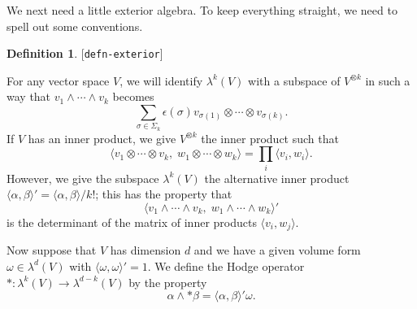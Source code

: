 \documentclass[reqno]{amsart}
\newcommand{\lbl}[1]{\label{#1}\textup{[\texttt{#1}]}\par}
\newcommand{\lbl}{\label}
\newcommand{\Sg}        {\Sigma}
\newcommand{\al}        {\alpha}
\newcommand{\bt}        {\beta}
\newcommand{\ep}        {\epsilon}
\newcommand{\lm}        {\lambda}
\newcommand{\om}        {\omega}
\newcommand{\sg}        {\sigma}
\newcommand{\ip}[1]     {\langle #1\rangle}
\newcommand{\ot}        {\otimes}
\renewcommand{\:}{\colon}
\theoremstyle{definition}
\newtheorem{definition}[theorem]{Definition}
\begin{document}
We next need a little exterior algebra.  To keep everything straight,
we need to spell out some conventions.
\begin{definition}\lbl{defn-exterior}
 For any vector space $V$, we will identify $\lm^k(V)$ with a subspace
 of $V^{\ot k}$ in such a way that $v_1\wedge\dotsb\wedge v_k$ becomes
 \[ \sum_{\sg\in\Sg_k}
     \ep(\sg) v_{\sg(1)}\ot\dotsb\ot v_{\sg(k)}.
 \]
 If $V$ has an inner product, we give $V^{\ot k}$ the inner product
 such that
 \[ \ip{v_1\ot\dotsb\ot v_k,\;w_1\ot\dotsb\ot w_k} =
     \prod_i \ip{v_i,w_i}.
 \]
 However, we give the subspace $\lm^k(V)$ the alternative inner
 product $\ip{\al,\bt}'=\ip{\al,\bt}/k!$; this has the property that
 \[ \ip{v_1\wedge\dotsb\wedge v_k,\;w_1\wedge\dotsb\wedge w_k}' \]
 is the determinant of the matrix of inner products $\ip{v_i,w_j}$.

 Now suppose that $V$ has dimension $d$ and we have a given volume
 form $\om\in\lm^d(V)$ with $\ip{\om,\om}'=1$.  We define the Hodge
 operator $*\:\lm^k(V)\to\lm^{d-k}(V)$ by the property
 \[ \al\wedge *\bt = \ip{\al,\bt}'\om. \]
\end{definition}
\end{document}
